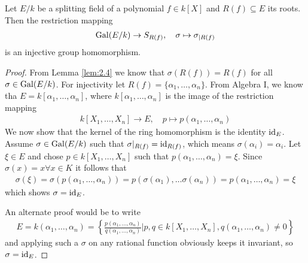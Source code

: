 \begin{lem}\label{lem:2.4}
  Let $E/k$ be a splitting field of a polynomial $f \in k[X]$ and $R(f) \subseteq E$ its roots. Then the restriction mapping
  \begin{align*}
    \operatorname{Gal}(E/k) \to S_{R(f)}, \quad \sigma \mapsto  \sigma_{|R(f)}
  \end{align*}
  is an injective group homomorphism.
\end{lem}
\begin{proof}
  From Lemma \ref{lem:2.4} we know that $\sigma(R(f)) = R(f)$ for all $\sigma \in \operatorname{Gal}(E/k)$.
  For injectivity let $R(f) = \{\alpha_{1}, \ldots, \alpha_{n}\}$. From Algebra I, we know tha $E = k[\alpha_{1}, \ldots, \alpha_{n}]$, where $k[\alpha_{1}, \ldots, \alpha_{n}]$ is the image of the restriction mapping
  \begin{align*}
    k[X_{1}, \ldots, X_{n}] \to E, \quad p \mapsto p(\alpha_{1}, \ldots, \alpha_{n})
  \end{align*}
  We now show that the kernel of the ring homomorphism is the identity $\operatorname{id}_E$. 
  Assume $\sigma \in \operatorname{Gal}(E/k)$ such that $\sigma|_{R(f)} = \operatorname{id}_{R(f)}$, which means $\sigma(\alpha_i) = \alpha_i$.
  Let $\xi \in E$ and chose $p \in k[X_{1}, \ldots, X_{n}]$ such that $p(\alpha_{1}, \ldots, \alpha_{n}) = \xi$.
  Since $\sigma(x) = x \forall x \in K$ it follows that
  \begin{align*}
    \sigma(\xi) = \sigma(p(\alpha_{1}, \ldots, \alpha_{n})) = p(\sigma(\alpha_1), \ldots \sigma(\alpha_n)) = p(\alpha_{1}, \ldots, \alpha_{n}) = \xi
  \end{align*}
  which shows $\sigma = \operatorname{id}_E$.

  An alternate proof would be to write
  \begin{align*}
    E = k(\alpha_{1}, \ldots, \alpha_{n}) = \left\{\frac{p(\alpha_{1}, \ldots, \alpha_{n})}{q(\alpha_{1}, \ldots, \alpha_{n})} \big\vert p,q \in k[X_{1}, \ldots, X_{n}], q(\alpha_{1}, \ldots, \alpha_{n}) \neq 0\right\}
  \end{align*}
  and applying such a $\sigma$ on any rational function obviously keeps it invariant, so $\sigma = \operatorname{id}_E$.
\end{proof}
